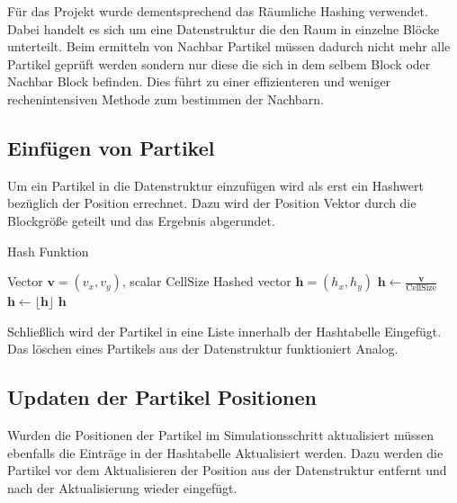 \documentclass[a4paper, 12pt]{article}
\begin{document}
Für das Projekt wurde dementsprechend das Räumliche Hashing verwendet. Dabei handelt es sich um eine Datenstruktur die den Raum in einzelne Blöcke unterteilt. Beim ermitteln von Nachbar Partikel müssen dadurch nicht mehr alle Partikel geprüft werden sondern nur diese die sich in dem selbem Block oder Nachbar Block befinden. Dies führt zu einer effizienteren und weniger rechenintensiven Methode zum bestimmen der Nachbarn.

\subsection{Einfügen von Partikel}
Um ein Partikel in die Datenstruktur einzufügen wird als erst ein Hashwert bezüglich der Position errechnet. Dazu wird der Position Vektor durch die Blockgröße geteilt und das Ergebnis abgerundet.
\begin{algorithm}[H]
	\caption{Hash Funktion}
	\begin{algorithmic}[1]
		\Require Vector $\mathbf{v} = (v_x, v_y)$, scalar $\text{CellSize}$
		\Ensure Hashed vector $\mathbf{h} = (h_x, h_y)$
		\State $\mathbf{h} \leftarrow \frac{\mathbf{v}}{\text{CellSize}}$
		\State $\mathbf{h} \leftarrow \lfloor \mathbf{h} \rfloor$
		\Return $\mathbf{h}$
	\end{algorithmic}
\end{algorithm}

Schließlich wird der Partikel in eine Liste innerhalb der Hashtabelle Eingefügt. Das löschen eines Partikels aus der Datenstruktur funktioniert Analog.

\subsection{Updaten der Partikel Positionen}
Wurden die Positionen der Partikel im Simulationsschritt aktualisiert müssen ebenfalls die Einträge in der Hashtabelle Aktualisiert werden. Dazu werden die Partikel vor dem Aktualisieren der Position aus der Datenstruktur entfernt und nach der Aktualisierung wieder eingefügt. 
\end{document}
